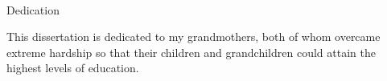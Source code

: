 
\renewcommand{\baselinestretch}{2}
\small\normalsize
\hbox{\ }

\vspace{-.65in}

\begin{center}
\large{Dedication}
\end{center}

This dissertation is dedicated to my grandmothers, both of whom overcame extreme hardship so that their children and grandchildren could attain the highest levels of education.

